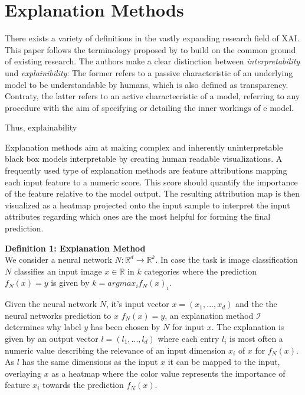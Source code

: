\section{Explanation Methods}
\label{sec:explanation_methods}

There exists a variety of definitions in the vastly expanding research field of XAI. This paper follows the terminology proposed by \cite{arrieta2020explainable} to build on the common ground of existing research. The authors make a clear distinction between \textit{interpretability} und \textit{explainibility}: The former refers to a passive characteristic of an underlying model to be understandable by humans, which is also defined as transparency. Contraty, the latter refers to an active charactecristic of a model, referring to any procedure with the aim of specifying or detailing the inner workings of e model. 

Thus, explainability 


Explanation methods aim at making complex and inherently uninterpretable black box models interpretable by creating human readable visualizations. 
A frequently used type of explanation methods are feature attributions mapping each input feature to a numeric score. This score should quantify the importance of the feature relative to the model output. The resulting attribution map is then visualized as a heatmap projected onto the input sample to interpret the input attributes regarding which ones are the most helpful for forming the final prediction. 

\textbf{Definition 1: Explanation Method}\\
We consider a neural network $N: \mathbb{R}^d \to \mathbb{R}^k$. In case the task is image classification $N$ classifies an input image $x\in  \mathbb{R}$ in $k$ categories where the prediction $f_N(x)=y$ is given by $k= arg max_i f_N(x)_i$.

Given the neural network $N$, it's input vector $x=(x_1, ..., x_d)$ and the the neural networks prediction to $x$ $f_N(x)=y$, an explanation method $\mathcal{I}$ determines why label $y$ has been chosen by $N$ for input $x$. The explanation is given by an output vector $l=(l_1, ..., l_d)$ where each entry $l_i$ is most often a numeric value describing the relevance of an input dimension $x_i$ of $x$ for $f_N(x)$. 
As $l$ has the same dimensions as the input $x$ it can be mapped to the input, overlaying $x$ as a heatmap where the color value represents the importance of feature $x_i$ towards the prediction $f_N(x)$.

